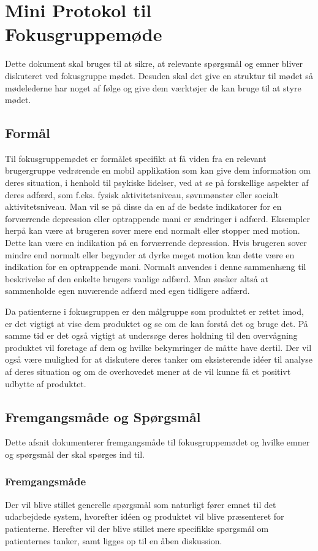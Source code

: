 


\chapter*{Mini Protokol til Fokusgruppemøde}
Dette dokument skal bruges til at sikre, at relevante spørgsmål og emner bliver diskuteret ved fokusgruppe mødet.
Desuden skal det give en struktur til mødet så mødelederne har noget af følge og give dem værktøjer de kan bruge til at styre mødet.

\section*{Formål}
Til fokusgruppemødet er formålet specifikt at få viden fra en relevant brugergruppe vedrørende en mobil applikation som kan give dem information om deres situation, i henhold til psykiske lidelser, ved at se på forskellige aspekter af deres adfærd, som f.eks. fysisk aktivitetsniveau, søvnmønster eller socialt aktivitetsniveau. 
Man vil se på disse da en af de bedste indikatorer for en forværrende depression eller optrappende mani er ændringer i adfærd.
Eksempler herpå kan være at brugeren sover mere end normalt eller stopper med motion.
Dette kan være en indikation på en forværrende depression.
Hvis brugeren sover mindre end normalt eller begynder at dyrke meget motion kan dette være en indikation for en optrappende mani.
Normalt anvendes i denne sammenhæng til beskrivelse af den enkelte brugers vanlige adfærd.
Man ønsker altså at sammenholde egen nuværende adfærd med egen tidligere adfærd.
 
Da patienterne i fokusgruppen er den målgruppe som produktet er rettet imod, er det vigtigt at vise dem produktet og se om de kan forstå det og bruge det.
På samme tid er det også vigtigt at undersøge deres holdning til den overvågning produktet vil foretage af dem og hvilke bekymringer de måtte have dertil.
Der vil også være mulighed for at diskutere deres tanker om eksisterende idéer til analyse af deres situation og om de overhovedet mener at de vil kunne få et positivt udbytte af produktet.

\section*{Fremgangsmåde og Spørgsmål}
Dette afsnit dokumenterer fremgangsmåde til fokusgruppemødet og hvilke emner og spørgsmål der skal spørges ind til.

\subsection*{Fremgangsmåde}
Der vil blive stillet generelle spørgsmål som naturligt fører emnet til det udarbejdede system, hvorefter idéen og produktet vil blive præsenteret for patienterne. 
Herefter vil der blive stillet mere specifikke spørgsmål om patienternes tanker, samt ligges op til en åben diskussion.

